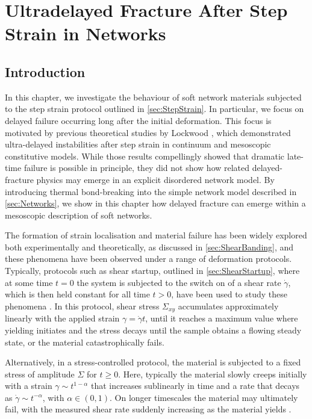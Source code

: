 
\chapter{Ultradelayed Fracture After Step Strain in Networks} \label{sec:Ultradelayed}

\section{Introduction} \label{sec:delayedInto}
In this chapter, we investigate the behaviour of soft network materials subjected to the step strain protocol outlined in \cref{sec:StepStrain}. In particular, we focus on delayed failure occurring long after the initial deformation. This focus is motivated by previous theoretical studies by Lockwood \etal\cite{lockwood_ultradelayed_2025}, which demonstrated ultra-delayed instabilities after step strain in continuum and mesoscopic constitutive models. While those results compellingly showed that dramatic late-time failure is possible in principle, they did not show how related delayed-fracture physics may emerge in an explicit disordered network model. By introducing thermal bond-breaking into the simple network model described in \cref{sec:Networks}, we show in this chapter how delayed fracture can emerge within a mesoscopic description of soft networks.

The formation of strain localisation and material failure has been widely explored both experimentally and theoretically, as discussed in \cref{sec:ShearBanding}, and these phenomena have been observed under a range of deformation protocols. Typically, protocols such as shear startup, outlined in \cref{sec:ShearStartup}, where at some time $t=0$ the system is subjected to the switch on of a shear rate $\dot{\gamma}$, which is then held constant for all time $t>0$, have been used to study these phenomena \cite{moorcroft_shear_2014,moorcroft_criteria_2013,pollard_yielding_2022,moorcroft_age-dependent_2011,divouxTransientShearBanding2010,divoux_stress_2011,kurokawa_avalanche-like_2015}. In this protocol, shear stress $\Sigma_{xy}$ accumulates approximately linearly with the applied strain $\gamma = \dot{\gamma}t$, until it reaches a maximum value where yielding initiates and the stress decays until the sample obtains a flowing steady state, or the material catastrophically fails. 

Alternatively, in a stress-controlled protocol, the material is subjected to a fixed stress of amplitude $\Sigma$ for $t \geq 0$. Here, typically the material slowly creeps initially with a strain $\gamma \sim t^{1-\alpha}$ that increases sublinearly in time and a rate that decays as $\dot{\gamma} \sim t^{-\alpha}$, with $\alpha \in \left( 0,1 \right)$. On longer timescales the material may ultimately fail, with the measured shear rate suddenly increasing as the material yields \cite{miguel_dislocation_2002,gibaud_heterogeneous_2010,leocmach_creep_2014,ballesta_creep_2016,liuCreepDynamicsAthermal2018,cabriolu_precursors_2019,siebenburger_creep_2012}.

